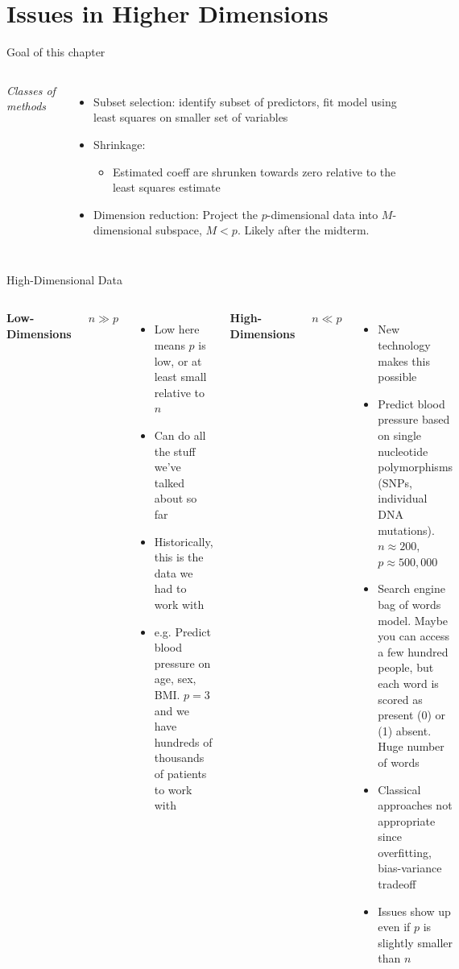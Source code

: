 \documentclass[aspectratio=169,usenames,dvipsnames]{beamer}
\newcommand{\InstructorNotes}[1]{\textit{\color{orange}#1}}
\newcommand{\InstructorList}[1]{
\begin{itemize}
	\color{orange}
	#1
\end{itemize}
}
\begin{document}
\section{Issues in Higher Dimensions}
\begin{frame}[c]{Goal of this chapter}

\begin{columns}
\centering

\InstructorNotes{Classes of methods }
\InstructorList{
\item Subset selection: identify subset of predictors, fit model using least squares on smaller set of variables
\item Shrinkage:
\InstructorList{
\item Estimated coeff are shrunken towards zero relative to the least squares estimate
}
\item Dimension reduction: Project the $p$-dimensional data into $M$-dimensional subspace, $M <p$. Likely after the midterm.
}
\centering

\end{columns}

\end{frame}
\begin{frame}[t]{High-Dimensional Data}

\begin{columns}
\centering
\textbf{Low-Dimensions}

$n \gg p$

\footnotesize
\InstructorList{
\item Low here means $p$ is low, or at least small relative to $n$
\item Can do all the stuff we've talked about so far
\item Historically, this is the data we had to work with
\item e.g. Predict blood pressure on age, sex, BMI. $p=3$ and we have hundreds of thousands of patients to work with
}
\centering
\textbf{High-Dimensions}

$n \ll p$

\footnotesize
\InstructorList{
  \item New technology makes this possible
	\item Predict blood pressure based on single nucleotide polymorphisms (SNPs, individual DNA mutations). $n \approx 200$, $p \approx 500,000$
	\item Search engine bag of words model. Maybe you can access a few hundred people, but each word is scored as present (0) or (1) absent.  Huge number of words
	\item Classical approaches not appropriate since overfitting, bias-variance tradeoff
	\item Issues show up even if $p$ is slightly smaller than $n$
}



\end{columns}

\end{frame}
\end{document}
